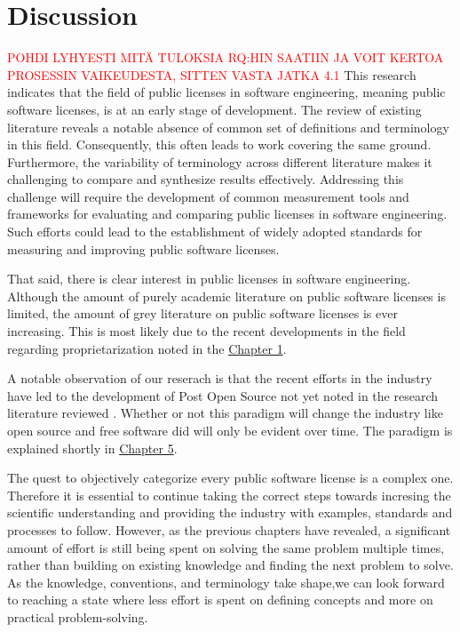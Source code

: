 \chapter{Discussion\label{discussion}}
\textcolor{red}{POHDI LYHYESTI MITÄ TULOKSIA RQ:HIN SAATIIN JA VOIT KERTOA PROSESSIN VAIKEUDESTA, SITTEN VASTA JATKA 4.1}
This research indicates that the field of public licenses in software engineering, meaning public software licenses, is at an early stage of development. The review of existing literature reveals a notable absence of common set of definitions and terminology in this field. Consequently, this often leads to work covering the same ground. Furthermore, the variability of terminology across different literature makes it challenging to compare and synthesize results effectively. Addressing this challenge will require the development of common measurement tools and frameworks for evaluating and comparing public licenses in software engineering. Such efforts could lead to the establishment of widely adopted standards for measuring and improving public software licenses.

That said, there is clear interest in public licenses in software engineering. Although the amount of purely academic literature on public software licenses is limited, the amount of grey literature on public software licenses is ever increasing. This is most likely due to the recent developments in the field regarding proprietarization noted in the \hyperref[intro]{Chapter 1}. 

A notable observation of our reserach is that the recent efforts in the industry have led to the development of Post Open Source not yet noted in the research literature reviewed \citep{register:poss}. Whether or not this paradigm will change the industry like open source and free software did will only be evident over time. The paradigm is explained shortly in \hyperref[conclusions]{Chapter 5}.

The quest to objectively categorize every public software license is a complex one. Therefore it is essential to continue taking the correct steps towards incresing the scientific understanding and providing the industry with examples, standards and processes to follow. However, as the previous chapters have revealed, a significant amount of effort is still being spent on solving the same problem multiple times, rather than building on existing knowledge and finding the next problem to solve. As the knowledge, conventions, and terminology take shape,we can look forward to reaching a state where less effort is spent on defining concepts and more on practical problem-solving.

